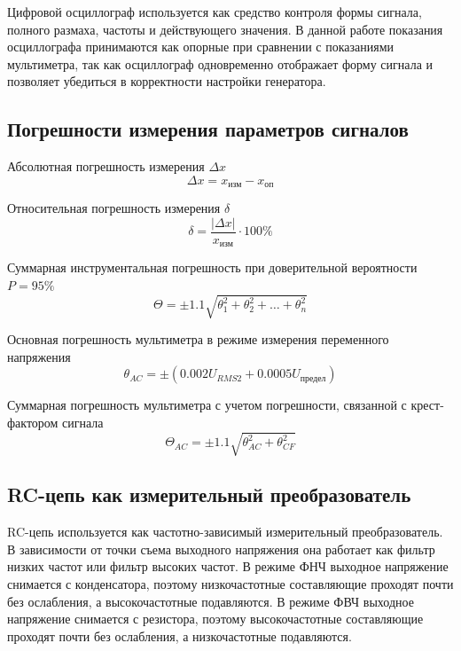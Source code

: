 \documentclass[12pt,a4paper]{article}
\begin{document}
Цифровой осциллограф используется как средство контроля формы сигнала, полного размаха, частоты и действующего значения. В данной работе показания осциллографа принимаются как опорные при сравнении с показаниями мультиметра, так как осциллограф одновременно отображает форму сигнала и позволяет убедиться в корректности настройки генератора.

\subsection{Погрешности измерения параметров сигналов}

Абсолютная погрешность измерения $\Delta x$
\begin{equation*}
\Delta x=x_{\text{изм}}-x_{\text{оп}}
\end{equation*}

Относительная погрешность измерения $\delta$
\begin{equation*}
\delta=\frac{|\Delta x|}{x_{\text{изм}}}\cdot100\%
\end{equation*}

Суммарная инструментальная погрешность при доверительной вероятности $P=95\%$
\begin{equation*}
\Theta=\pm1.1\sqrt{\theta_1^2+\theta_2^2+\ldots+\theta_n^2}
\end{equation*}

Основная погрешность мультиметра в режиме измерения переменного напряжения
\begin{equation*}
\theta_{AC}=\pm\left(0.002U_{RMS2}+0.0005U_{\text{предел}}\right)
\end{equation*}

Суммарная погрешность мультиметра с учетом погрешности, связанной с крест-фактором сигнала
\begin{equation}
\Theta_{AC}=\pm1.1\sqrt{\theta_{AC}^2+\theta_{CF}^2}
\label{eq:dmm-ac-full}
\end{equation}

\subsection{RC-цепь как измерительный преобразователь}

RC-цепь используется как частотно-зависимый измерительный преобразователь. В зависимости от точки съема выходного напряжения она работает как фильтр низких частот или фильтр высоких частот. В режиме ФНЧ выходное напряжение снимается с конденсатора, поэтому низкочастотные составляющие проходят почти без ослабления, а высокочастотные подавляются. В режиме ФВЧ выходное напряжение снимается с резистора, поэтому высокочастотные составляющие проходят почти без ослабления, а низкочастотные подавляются.
\end{document}

